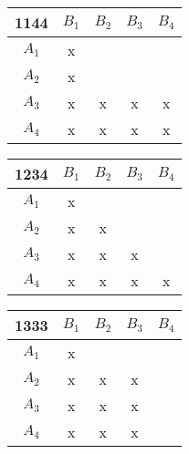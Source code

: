 % 
% 
% 
% 
% 
% 
% 

~

\begin{tabular}{c||c|c|c|c}
1144 & $B_1$ & $B_2$ & $B_3$ & $B_4$ \\\hline\hline
 $A_1$ & x & ~ & ~ & ~ \\
 $A_2$ & x & ~ & ~ & ~ \\
 $A_3$ & x & x & x & x \\
 $A_4$ & x & x & x & x \\
\end{tabular}
\hfill
\begin{tabular}{c||c|c|c|c}
1234 & $B_1$ & $B_2$ & $B_3$ & $B_4$ \\\hline\hline
 $A_1$ & x & ~ & ~ & ~ \\
 $A_2$ & x & x & ~ & ~ \\
 $A_3$ & x & x & x & ~ \\
 $A_4$ & x & x & x & x \\
\end{tabular}
\hfill
\begin{tabular}{c||c|c|c|c}
1333 & $B_1$ & $B_2$ & $B_3$ & $B_4$ \\\hline\hline
 $A_1$ & x & ~ & ~ & ~ \\
 $A_2$ & x & x & x & ~ \\
 $A_3$ & x & x & x & ~ \\
 $A_4$ & x & x & x & ~ \\
\end{tabular}

